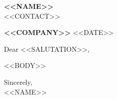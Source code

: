 \documentclass[11pt,letterpaper]{article}
\begin{document}
\begin{center}
  {\LARGE \textbf{<<NAME>>}}\\[5pt]
  <<CONTACT>>
\end{center}

\vspace{14pt}
\textbf{<<COMPANY>>} \hfill <<DATE>>

\vspace{6pt}
Dear <<SALUTATION>>,

<<BODY>>

\vspace{4pt}
Sincerely,\\[22pt]
<<NAME>>
\end{document}
